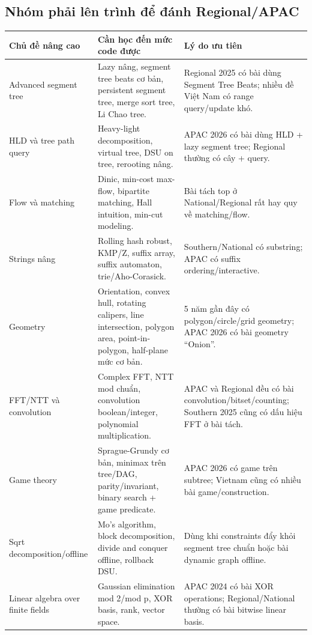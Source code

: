 \documentclass[11pt,a4paper]{article}
\begin{document}
\subsection{Nhóm phải lên trình để đánh Regional/APAC}

\begin{longtable}{p{3.2cm}p{5.3cm}p{5.7cm}}
\toprule
\textbf{Chủ đề nâng cao} & \textbf{Cần học đến mức code được} & \textbf{Lý do ưu tiên}\\
\midrule
Advanced segment tree & Lazy nâng, segment tree beats cơ bản, persistent segment tree, merge sort tree, Li Chao tree. & Regional 2025 có bài dùng Segment Tree Beats; nhiều đề Việt Nam có range query/update khó.\\
\addlinespace
HLD và tree path query & Heavy-light decomposition, virtual tree, DSU on tree, rerooting nâng. & APAC 2026 có bài dùng HLD + lazy segment tree; Regional thường có cây + query.\\
\addlinespace
Flow và matching & Dinic, min-cost max-flow, bipartite matching, Hall intuition, min-cut modeling. & Bài tách top ở National/Regional rất hay quy về matching/flow.\\
\addlinespace
Strings nâng & Rolling hash robust, KMP/Z, suffix array, suffix automaton, trie/Aho-Corasick. & Southern/National có substring; APAC có suffix ordering/interactive.\\
\addlinespace
Geometry & Orientation, convex hull, rotating calipers, line intersection, polygon area, point-in-polygon, half-plane mức cơ bản. & 5 năm gần đây có polygon/circle/grid geometry; APAC 2026 có bài geometry ``Onion''.\\
\addlinespace
FFT/NTT và convolution & Complex FFT, NTT mod chuẩn, convolution boolean/integer, polynomial multiplication. & APAC và Regional đều có bài convolution/bitset/counting; Southern 2025 cũng có dấu hiệu FFT ở bài tách.\\
\addlinespace
Game theory & Sprague-Grundy cơ bản, minimax trên tree/DAG, parity/invariant, binary search + game predicate. & APAC 2026 có game trên subtree; Vietnam cũng có nhiều bài game/construction.\\
\addlinespace
Sqrt decomposition/offline & Mo's algorithm, block decomposition, divide and conquer offline, rollback DSU. & Dùng khi constraints đẩy khỏi segment tree chuẩn hoặc bài dynamic graph offline.\\
\addlinespace
Linear algebra over finite fields & Gaussian elimination mod 2/mod p, XOR basis, rank, vector space. & APAC 2024 có bài XOR operations; Regional/National thường có bài bitwise linear basis.\\
\bottomrule
\end{longtable}
\end{document}
